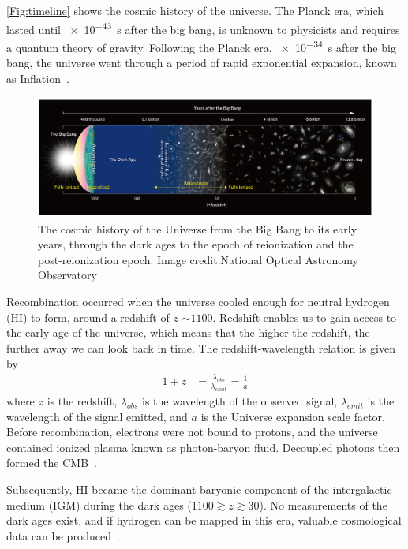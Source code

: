 \autoref{Fig:timeline} shows the cosmic history of the universe. The Planck era, which lasted until \SI{e-43}{s} after the big bang, is unknown to physicists and requires a quantum theory of gravity. Following the Planck era, \SI{e-34}{s} after the big bang, the universe went through a period of rapid exponential expansion, known as Inflation~\citep{1981PhRvD..23..347G}.

\begin{figure}
	\begin{center}
		\includegraphics[width=\linewidth]{Figures/Reionizationtimeline.jpg}
		\caption{The cosmic history of the Universe from the Big Bang to its early years, through the dark ages to the epoch of reionization and the post-reionization epoch. Image credit:National Optical Astronomy Observatory}
		\label{Fig:timeline}
	\end{center}
\end{figure} 

Recombination occurred when the universe cooled enough for neutral hydrogen (HI) to form, around a redshift of $z$ $\sim1100$. Redshift enables us to gain access to the early age of the universe, which means that the higher the redshift, the further away we can look back in time. The redshift-wavelength relation is given by
\begin{equation}
\begin{split}
1+z & = \frac{\lambda_{obs}}{\lambda_{emit}}= \frac{1}{a}
\end{split}
\end{equation}
where $z$ is the redshift, $\lambda_{obs}$ is the wavelength of the observed signal, $\lambda_{emit}$ is the wavelength of the signal emitted, and $a$ is the Universe expansion scale factor. Before recombination, electrons were not bound to protons, and the universe contained ionized plasma known as photon-baryon fluid. Decoupled photons then formed the CMB~\citep{1965ApJ...142..419P}.

Subsequently, HI became the dominant baryonic component of the intergalactic medium (IGM) during the dark ages ($1100 \gtrsim z \gtrsim 30$). No measurements of the dark ages exist, and if hydrogen can be mapped in this era, valuable cosmological data can be produced~\citep{11, 2004PhRvL..92u1301L}.

